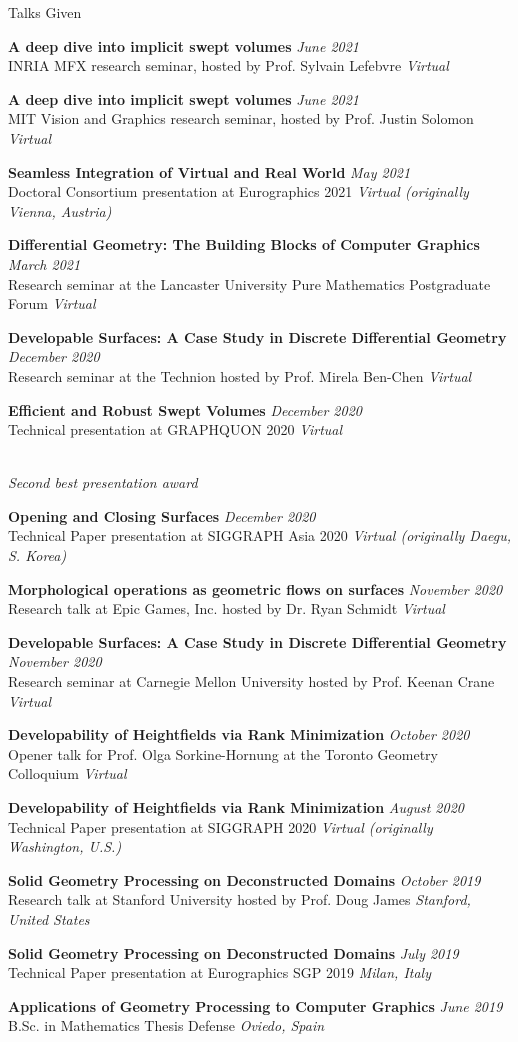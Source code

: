 \documentclass{resume}
\newcommand{\talk}[4]{
    {\bf #1} \hfill {\em \small #2} \\ %
    {\small #3} \hfill {\em \small #4}
}
\begin{document}
\begin{rSection}{Talks Given}
\talk{A deep dive into implicit swept volumes}{June 2021}
{INRIA MFX research seminar, hosted by Prof. Sylvain Lefebvre}{Virtual}

\talk{A deep dive into implicit swept volumes}{June 2021}
{MIT Vision and Graphics research seminar, hosted by Prof. Justin Solomon}{Virtual}

\talk{Seamless Integration of Virtual and Real World}{May 2021}
{Doctoral Consortium presentation at Eurographics 2021}{Virtual (originally Vienna, Austria)}

\talk{Differential Geometry: The Building Blocks of Computer Graphics}{March 2021}
{Research seminar at the Lancaster University Pure Mathematics Postgraduate Forum}{Virtual}

\talk{Developable Surfaces: A Case Study in Discrete Differential Geometry}{December 2020}
{Research seminar at the Technion hosted by Prof. Mirela Ben-Chen}{Virtual}

\talk{Efficient and Robust Swept Volumes}{December 2020}
{Technical presentation at GRAPHQUON 2020}{Virtual}
\\{\it Second best presentation award}

\talk{Opening and Closing Surfaces}{December 2020}
{Technical Paper presentation at SIGGRAPH Asia 2020}{Virtual (originally Daegu, S. Korea)}

\talk{Morphological operations as geometric flows on surfaces}{November 2020}
{Research talk at Epic Games, Inc. hosted by Dr. Ryan Schmidt}{Virtual}

\talk{Developable Surfaces: A Case Study in Discrete Differential Geometry}{November 2020}
{Research seminar at Carnegie Mellon University hosted by Prof. Keenan Crane}{Virtual}

\talk{Developability of Heightfields via Rank Minimization}{October 2020}
{Opener talk for Prof. Olga Sorkine-Hornung at the Toronto Geometry Colloquium}{Virtual}

\talk{Developability of Heightfields via Rank Minimization}{August 2020}
{Technical Paper presentation at SIGGRAPH 2020}{Virtual (originally Washington, U.S.)}

\talk{Solid Geometry Processing on Deconstructed Domains}{October 2019}
{Research talk at Stanford University hosted by Prof. Doug James}{Stanford, United States}

\talk{Solid Geometry Processing on Deconstructed Domains}{July 2019}
{Technical Paper presentation at Eurographics SGP 2019}{Milan, Italy}

\talk{Applications of Geometry Processing to Computer Graphics}{June 2019}
{B.Sc. in Mathematics Thesis Defense}{Oviedo, Spain}


\end{rSection}
\end{document}
